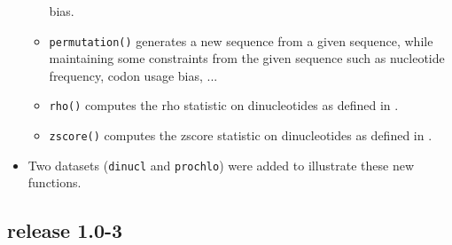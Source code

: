 \documentclass{article}
\begin{document}
\begin{itemize}
\begin{itemize}
      bias.
\item \texttt{permutation()} generates a new sequence from a given
  sequence, while maintaining some constraints from the given sequence
  such as nucleotide frequency, codon usage bias, ...
\item \texttt{rho()} computes the rho statistic on dinucleotides as
  defined in \cite{Karlin}.
\item \texttt{zscore()} computes the zscore statistic on dinucleotides
  as defined in \cite{UV}.
\end{itemize}
\item Two datasets (\texttt{dinucl} and \texttt{prochlo}) were added
  to illustrate these new functions.

\end{itemize}

\subsection*{release 1.0-3}
\end{document}
